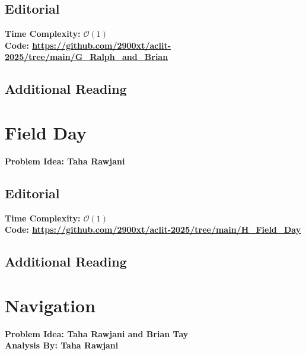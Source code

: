 \documentclass{article}
\newcommand{\link}[1]{\textcolor{blue!50!black}{\uline{\url{#1}}}}
\begin{document}
\subsection{Editorial}
\textbf{Time Complexity: $\mathcal{O}(1)$}\\
\textbf{Code: \link{https://github.com/2900xt/aclit-2025/tree/main/G_Ralph_and_Brian}}
\subsection{Additional Reading}
\newpage
\section{Field Day}
\textbf{Problem Idea: Taha Rawjani}
\subsection{Editorial}
\textbf{Time Complexity: $\mathcal{O}(1)$}\\
\textbf{Code: \link{https://github.com/2900xt/aclit-2025/tree/main/H_Field_Day}}
\subsection{Additional Reading}
\newpage
\section{Navigation}
\textbf{Problem Idea: Taha Rawjani and Brian Tay\\Analysis By: Taha Rawjani}
\end{document}
